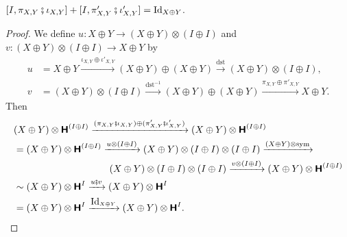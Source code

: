 \begin{lemma}
  $[I,\pi_{X,Y} \fatsemi \iota_{X,Y}] +
  [I,\pi'_{X,Y} \fatsemi \iota'_{X,Y}] = \mbox{Id}_{X \oplus Y}$.
\end{lemma}
\begin{proof}
  We define $u \colon X \oplus Y \to (X \oplus Y) \otimes (I \oplus I)$
  and $v \colon (X \oplus Y) \otimes (I \oplus I) \to X \oplus Y$ by
  \begin{align*}
    u &= X \oplus Y \xrightarrow{\iota_{X,Y} \oplus \iota'_{X,Y}}
        (X \oplus Y) \oplus (X \oplus Y) \xrightarrow{\mathrm{dst}}
        (X \oplus Y) \otimes (I \oplus I), \\
    v &= (X \oplus Y) \otimes (I \oplus I) \xrightarrow{\mathrm{dst}^{-1}}
        (X \oplus Y) \oplus (X \oplus Y) \xrightarrow{\pi_{X,Y} \oplus \pi'_{X,Y}}
        X \oplus Y.
  \end{align*}
  Then
  \begin{align*}
    & (X \oplus Y) \otimes \hide{(I \oplus I)}
      \xrightarrow{(\pi_{X,Y} \fatsemi \iota_{X,Y}) \oplus (\pi'_{X,Y} \fatsemi \iota'_{X,Y})}
      (X \oplus Y) \otimes \hide{(I \oplus I)} \\
    &= (X \oplus Y) \otimes \hide{(I \oplus I)}
      \xrightarrow{u \otimes (I \oplus I)}
      (X \oplus Y) \otimes (I \oplus I) \otimes (I \oplus I)
      \xrightarrow{(X \oplus Y) \otimes \mathrm{sym}} \\
    &\hspace{10em}
      (X \oplus Y) \otimes (I \oplus I) \otimes (I \oplus I)
      \xrightarrow{v \otimes (I \oplus I)}
      (X \oplus Y) \otimes \hide{(I \oplus I)} \\
    &\sim
      (X \oplus Y) \otimes \hide{I}
      \xrightarrow{u \fatsemi v}
      (X \oplus Y) \otimes \hide{I} \\
    &=
      (X \oplus Y) \otimes \hide{I}
      \xrightarrow{\Id_{X \oplus Y}}
      (X \oplus Y) \otimes \hide{I}.
  \end{align*}
\end{proof}

